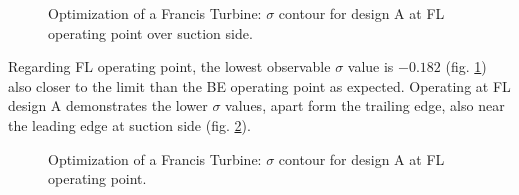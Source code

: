 \begin{figure}[h!]
\begin{minipage}[b]{1\linewidth}
 \centering
\end{minipage}
\caption{Optimization of a Francis Turbine: $\sigma$ contour for design A at FL operating point over suction side.}
\label{Francis-A-FL}
\end{figure}

Regarding FL operating point, the lowest observable $\sigma$ value is $-0.182$ (fig. \ref{Francis-A-FL}) also closer to the limit than the BE operating point as expected. Operating at FL design A demonstrates the lower $\sigma$ values, apart form the trailing edge, also near the leading edge at suction side (fig. \ref{Francis-A-SS}). 


\begin{figure}[h!]
\begin{minipage}[b]{1\linewidth}
 \centering
\end{minipage}
\caption{Optimization of a Francis Turbine: $\sigma$ contour for design A at FL operating point.}
\label{Francis-A-SS}
\end{figure}

